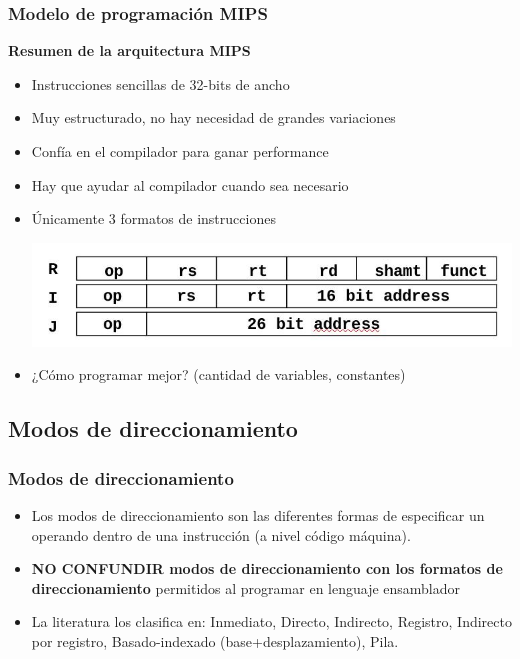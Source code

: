 \documentclass[aspectratio=169,compress]{beamer}
\begin{document}
\begin{footnotesize}
\begin{frame}
\begin{tabular}{cl}
\end{tabular}
\end{frame}


\begin{frame}[fragile]
\frametitle{Modelo de programación MIPS}
\begin{center}\textbf{Resumen de la arquitectura MIPS}\end{center}
\begin{itemize}
\item Instrucciones sencillas de 32-bits de ancho
\item Muy estructurado, no hay necesidad de grandes variaciones
\item Confía en el compilador para ganar performance
\item Hay que ayudar al compilador cuando sea necesario
\item Únicamente 3 formatos de instrucciones
	\begin{center}
\includegraphics[scale=0.3]{images/formato2.jpg} 
	\end{center}
\item ¿Cómo programar mejor? (cantidad de variables, constantes)
\end{itemize}
\end{frame}


\subsection{Modos de direccionamiento}

\begin{frame}[fragile]
\frametitle{Modos de direccionamiento}
\begin{itemize}
\item Los modos de direccionamiento son las diferentes formas de especificar un operando dentro de una instrucción (a nivel código máquina).
\item \textbf{NO CONFUNDIR modos de direccionamiento con los formatos de direccionamiento} permitidos al programar en lenguaje ensamblador
\item La literatura los clasifica en: Inmediato, Directo, Indirecto, Registro, Indirecto por registro, Basado-indexado (base+desplazamiento), Pila.
\end{itemize}
\end{frame}



\end{footnotesize}
\end{document}
